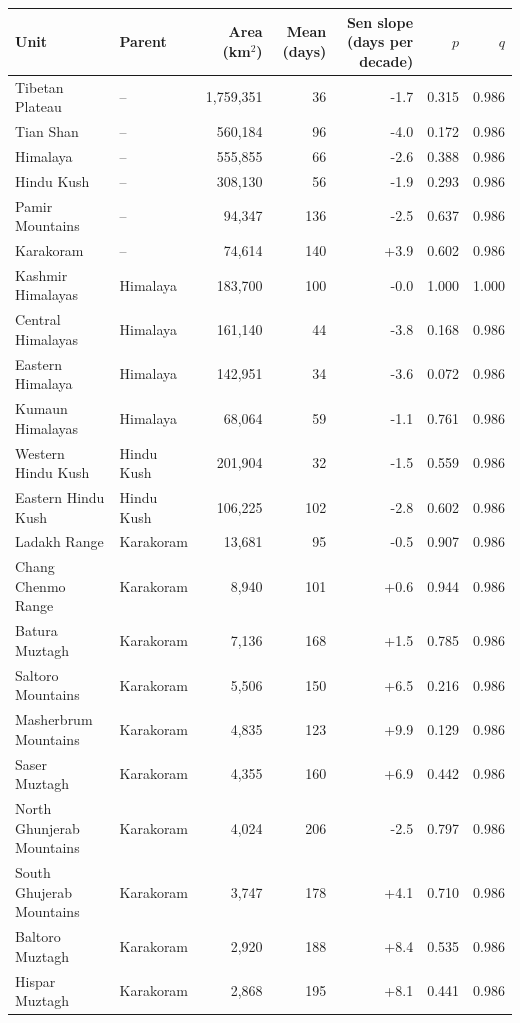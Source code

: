 \begin{tabular}{llrrrrr}
\toprule
Unit & Parent & Area (km$^2$) & Mean (days) & Sen slope (days per decade) & $p$ & $q$ \\
\midrule
Tibetan Plateau & -- & 1{,}759{,}351 & 36 & -1.7 & 0.315 & 0.986 \\
Tian Shan & -- & 560{,}184 & 96 & -4.0 & 0.172 & 0.986 \\
Himalaya & -- & 555{,}855 & 66 & -2.6 & 0.388 & 0.986 \\
Hindu Kush & -- & 308{,}130 & 56 & -1.9 & 0.293 & 0.986 \\
Pamir Mountains & -- & 94{,}347 & 136 & -2.5 & 0.637 & 0.986 \\
Karakoram & -- & 74{,}614 & 140 & +3.9 & 0.602 & 0.986 \\
Kashmir Himalayas & Himalaya & 183{,}700 & 100 & -0.0 & 1.000 & 1.000 \\
Central Himalayas & Himalaya & 161{,}140 & 44 & -3.8 & 0.168 & 0.986 \\
Eastern Himalaya & Himalaya & 142{,}951 & 34 & -3.6 & 0.072 & 0.986 \\
Kumaun Himalayas & Himalaya & 68{,}064 & 59 & -1.1 & 0.761 & 0.986 \\
Western Hindu Kush & Hindu Kush & 201{,}904 & 32 & -1.5 & 0.559 & 0.986 \\
Eastern Hindu Kush & Hindu Kush & 106{,}225 & 102 & -2.8 & 0.602 & 0.986 \\
Ladakh Range & Karakoram & 13{,}681 & 95 & -0.5 & 0.907 & 0.986 \\
Chang Chenmo Range & Karakoram & 8{,}940 & 101 & +0.6 & 0.944 & 0.986 \\
Batura Muztagh & Karakoram & 7{,}136 & 168 & +1.5 & 0.785 & 0.986 \\
Saltoro Mountains & Karakoram & 5{,}506 & 150 & +6.5 & 0.216 & 0.986 \\
Masherbrum Mountains & Karakoram & 4{,}835 & 123 & +9.9 & 0.129 & 0.986 \\
Saser Muztagh & Karakoram & 4{,}355 & 160 & +6.9 & 0.442 & 0.986 \\
North Ghunjerab Mountains & Karakoram & 4{,}024 & 206 & -2.5 & 0.797 & 0.986 \\
South Ghujerab Mountains & Karakoram & 3{,}747 & 178 & +4.1 & 0.710 & 0.986 \\
Baltoro Muztagh & Karakoram & 2{,}920 & 188 & +8.4 & 0.535 & 0.986 \\
Hispar Muztagh & Karakoram & 2{,}868 & 195 & +8.1 & 0.441 & 0.986 \\

\end{tabular}
